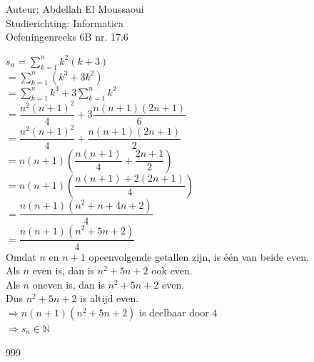 \documentclass[a4paper]{article}
\begin{document}
  
\noindent \large Auteur: Abdellah El Moussaoui \\
\noindent \large Studierichting: Informatica\\
\noindent \large Oefeningenreeks 6B nr. 17.6\\

\medskip

\normalsize

$s_n =\displaystyle\sum_{k=1}^{n}k^2 \left(k+3\right)$\\

$= \displaystyle\sum_{k=1}^{n} \left(k^3+3k^2\right)$\\

$= \displaystyle\sum_{k=1}^{n}k^3 + 3\displaystyle\sum_{k=1}^{n}k^2$\\

$= \dfrac{n^2\left(n+1\right)^2}{4} + 3\dfrac{n\left(n+1\right)\left(2n+1\right)}{6}$\\

$= \dfrac{n^2\left(n+1\right)^2}{4} + \dfrac{n\left(n+1\right)\left(2n+1\right)}{2}$\\

$= n\left(n+1\right)\left(\dfrac{n\left(n+1\right)}{4} + \dfrac{2n+1}{2}\right)$\\

$= n\left(n+1\right) \left(\dfrac{n\left(n+1\right) + 2\left(2n+1\right)}{4}\right)$\\

$= \dfrac{n\left(n+1\right) \left(n^2+n+4n+2\right)}{4}$\\

$= \dfrac{n\left(n+1\right) \left(n^2+5n+2\right)}{4}$\\

Omdat $n$ en $n+1$ opeenvolgende getallen zijn, is één van beide even.\\

Als $n$ even is, dan is $n^2+5n+2$ ook even.\\

Als $n$ oneven is, dan is $n^2+5n+2$ even.\\

Dus $n^2+5n+2$ is altijd even.\\

$\Rightarrow n\left(n+1\right)\left(n^2+5n+2\right)$ is deelbaar door $4$\\

$\Rightarrow s_n\in\mathbb{N}$\\


\begin{thebibliography}{999}
\end{thebibliography}
\end{document}
